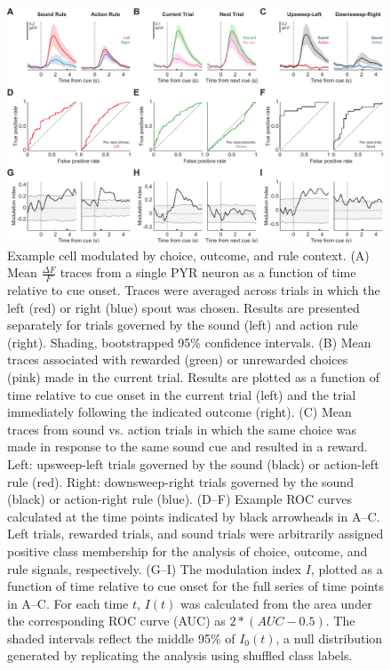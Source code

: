 \begin{figure}[htbp]

\begin{center}
\includegraphics[width=\textwidth]{Figures/Chapter4/Fig5}
\end{center}

\caption[Example cell modulated by choice, outcome, and rule context]
{Example cell modulated by choice, outcome, and rule context. (A) Mean $\frac{\Delta F}{F}$ traces from a single PYR neuron as a function of time relative to cue onset. Traces were averaged across trials in which the left (red) or right (blue) spout was chosen. Results are presented separately for trials governed by the sound (left) and action rule (right). Shading, bootstrapped 95\% confidence intervals. (B) Mean traces associated with rewarded (green) or unrewarded choices (pink) made in the current trial. Results are plotted as a function of time relative to cue onset in the current trial (left) and the trial immediately following the indicated outcome (right). (C) Mean traces from sound vs. action trials in which the same choice was made in response to the same sound cue and resulted in a reward. Left: upsweep-left trials governed by the sound (black) or action-left rule (red). Right: downsweep-right trials governed by the sound (black) or action-right rule (blue). (D--F) Example ROC curves calculated at the time points indicated by black arrowheads in A--C. Left trials, rewarded trials, and sound trials were arbitrarily assigned positive class membership for the analysis of choice, outcome, and rule signals, respectively. (G--I) The modulation index $I$, plotted as a function of time relative to cue onset for the full series of time points in A--C. For each time $t$, $I(t)$ was calculated from the area under the corresponding ROC curve (AUC) as $2*(\mathit{AUC}-0.5)$. The shaded intervals reflect the middle 95\% of $I_{0}(t)$, a null distribution generated by replicating the analysis using shuffled class labels.}

\label{fig:Fig5}
\end{figure}